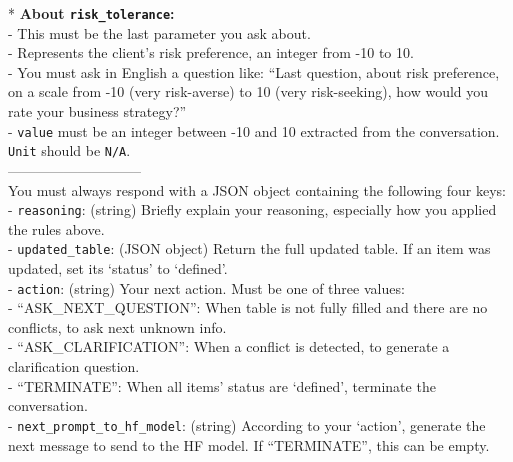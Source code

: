 \begin{table}[h]
\begin{tcolorbox}
    * \textbf{About \texttt{risk\_tolerance}:} \\
    \hspace*{1em} - This must be the last parameter you ask about. \\
    \hspace*{1em} - Represents the client's risk preference, an integer from -10 to 10. \\
    \hspace*{1em} - You must ask in English a question like: ``Last question, about risk preference, on a scale from -10 (very risk-averse) to 10 (very risk-seeking), how would you rate your business strategy?'' \\
    \hspace*{1em} - \texttt{value} must be an integer between -10 and 10 extracted from the conversation. \texttt{Unit} should be \texttt{N/A}.\\

    ----------------------------- \\

    You must always respond with a JSON object containing the following four keys: \\
    - \texttt{reasoning}: (string) Briefly explain your reasoning, especially how you applied the rules above. \\
    - \texttt{updated\_table}: (JSON object) Return the full updated table. If an item was updated, set its `status' to `defined'. \\
    - \texttt{action}: (string) Your next action. Must be one of three values: \\
    \hspace*{1em} - ``ASK\_NEXT\_QUESTION'': When table is not fully filled and there are no conflicts, to ask next unknown info. \\
    \hspace*{1em} - ``ASK\_CLARIFICATION'': When a conflict is detected, to generate a clarification question. \\
    \hspace*{1em} - ``TERMINATE'': When all items' status are `defined', terminate the conversation. \\
    - \texttt{next\_prompt\_to\_hf\_model}: (string) According to your `action', generate the next message to send to the HF model. If ``TERMINATE'', this can be empty.
    \end{tcolorbox}
    \caption{System prompt for Information Extraction Agent}
    \label{tab:system_prompt_info_extraction}
\end{table}


